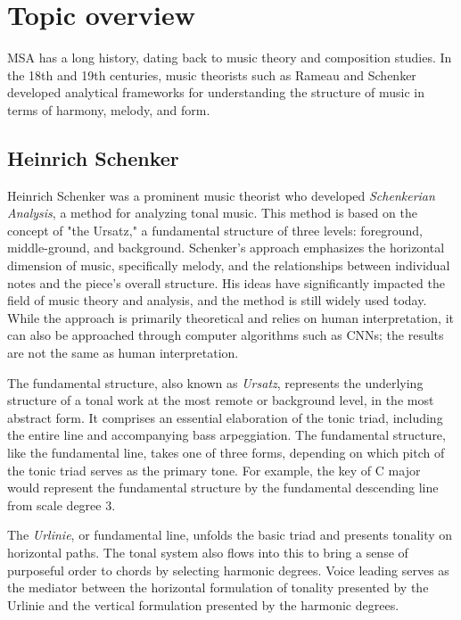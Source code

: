 \section{Topic overview}

MSA has a long history, dating back to music theory and composition studies. In the 18th and 19th centuries, music theorists such as Rameau and Schenker developed analytical frameworks for understanding the structure of music in terms of harmony, melody, and form.

\subsection{Heinrich Schenker}

Heinrich Schenker was a prominent music theorist who developed \textit{Schenkerian Analysis}, a method for analyzing tonal music. This method is based on the concept of "the Ursatz," a fundamental structure of three levels: foreground, middle-ground, and background. Schenker's approach emphasizes the horizontal dimension of music, specifically melody, and the relationships between individual notes and the piece's overall structure. His ideas have significantly impacted the field of music theory and analysis, and the method is still widely used today. While the approach is primarily theoretical and relies on human interpretation, it can also be approached through computer algorithms such as CNNs; the results are not the same as human interpretation.

The fundamental structure, also known as \textit{Ursatz}, represents the underlying structure of a tonal work at the most remote or background level, in the most abstract form. It comprises an essential elaboration of the tonic triad, including the entire line and accompanying bass arpeggiation. The fundamental structure, like the fundamental line, takes one of three forms, depending on which pitch of the tonic triad serves as the primary tone. For example, the key of C major would represent the fundamental structure by the fundamental descending line from scale degree 3.

The \textit{Urlinie}, or fundamental line, unfolds the basic triad and presents tonality on horizontal paths. The tonal system also flows into this to bring a sense of purposeful order to chords by selecting harmonic degrees. Voice leading serves as the mediator between the horizontal formulation of tonality presented by the Urlinie and the vertical formulation presented by the harmonic degrees.

